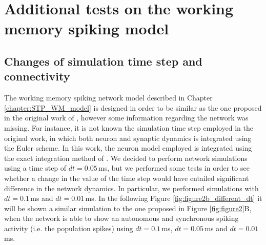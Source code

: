\documentclass[a4paper, 12pt, twoside, openright]{book}
\begin{document}
\chapter{Additional tests on the working memory spiking model}
\label{app:wm_additional_tests}

\section{Changes of simulation time step and connectivity}
The working memory spiking network model described in Chapter \ref{chapter:STP_WM_model} is designed in order to be similar as the one proposed in the original work of \cite{Mongillo2008}, however some information regarding the network was missing. For instance, it is not known the simulation time step employed in the original work, in which both neuron and synaptic dynamics is integrated using the Euler scheme. In this work, the neuron model employed is integrated using the exact integration method of \cite{Rotter1999}. We decided to perform network simulations using a time step of $dt=0.05$\,ms, but we performed some tests in order to see whether a change in the value of the time step would have entailed significant difference in the network dynamics. In particular, we performed simulations with $dt=0.1$\,ms and $dt=0.01$\,ms. In the following Figure \ref{fig:figure2b_different_dt} it will be shown a similar simulation to the one proposed in Figure \ref{fig:figure2}B, when the network is able to show an autonomous and synchronous spiking activity (i.e. the population spikes) using $dt=0.1$\,ms, $dt=0.05$\,ms and $dt=0.01$\,ms.
\end{document}
